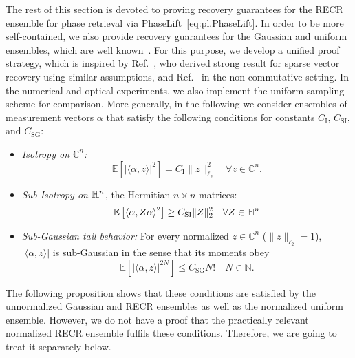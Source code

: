 The rest of this section is devoted to proving recovery guarantees for the RECR ensemble for phase retrieval via PhaseLift~\eqref{eq:pl.PhaseLift}.
In order to be more self-contained, we also provide recovery guarantees for the Gaussian and uniform ensembles, which are well known~\cite{Candes_2012_Solving,Demanet_2014_Stable}.
For this purpose, we develop a unified proof strategy, which is inspired by Ref.~\cite{Dirksen_2017_On}, who derived strong result for sparse vector recovery using similar assumptions, and Ref.~\cite{Kabanava_2015_Stable} in the non-commutative setting.
In the numerical and optical experiments, we also implement the uniform sampling scheme for comparison.
More generally, in the following we consider ensembles of measurement vectors $\alpha$ that satisfy the following conditions for constants $C_\mathrm{I}$, $C_\mathrm{SI}$, and $C_\mathrm{SG}$:

\begin{itemize}
  \item \emph{Isotropy on $\mathbb{C}^n$:}
  \[
    \mathbb{E} \left[ | \langle \alpha,  z \rangle |^2 \right] = C_\mathrm{I} \|  z \|_{\ell_2}^2 \quad \forall  z \in \mathbb{C}^n.
    \label{eq:pl.tight_frame}
  \]

  \item \emph{Sub-Isotropy on $\mathbb{H}^n$}, the Hermitian $n \times n$ matrices:
  \begin{align}
    \mathbb{E} \left[ \langle \alpha,  Z \alpha \rangle^2 \right] \geq C_\mathrm{SI} \|  Z \|_2^2 \quad \forall  Z \in \mathbb{H}^n \label{eq:pl.sub_isotropy}
  \end{align}

  \item \emph{Sub-Gaussian tail behavior:} For every normalized $ z \in \mathbb{C}^n$ ($\|  z \|_{\ell_2}=1$), $| \langle \alpha,  z \rangle|$ is sub-Gaussian in the sense that its moments obey
  \[
    \mathbb{E} \left[ | \langle \alpha,  z \rangle|^{2N} \right] \leq C_\mathrm{SG} N! \quad N \in \mathbb{N}.
  \label{eq:pl.subexponential}
  \]
\end{itemize}

The following proposition shows that these conditions are satisfied by the unnormalized Gaussian and RECR ensembles as well as the normalized uniform ensemble.
However, we do not have a proof that the practically relevant normalized RECR ensemble fulfils these conditions.
Therefore, we are going to treat it separately below.

